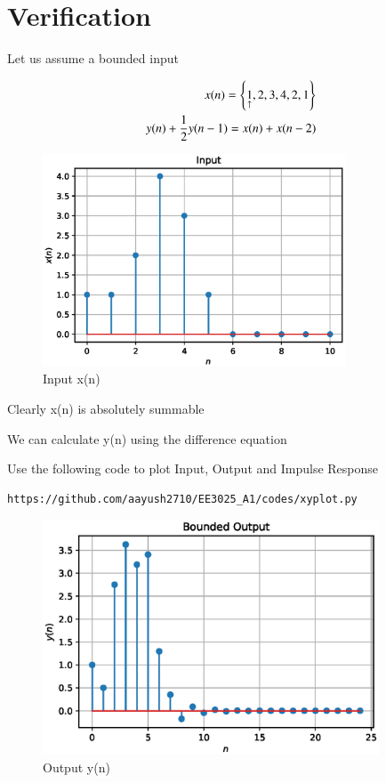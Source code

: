 \documentclass[journal,12pt,twocolumn]{IEEEtran}
\begin{document}
\section{Verification}

Let us assume a bounded input

\begin{align}
    x(n) = \left\{\underset{\uparrow}{1},2,3,4,2,1\right\}\\
    y(n)+\frac{1}{2}y(n-1) = x(n)+x(n-2)
\end{align}

\begin{figure}[h!]
    \centering
    \includegraphics[width=9cm]{./figs/fig_x.eps}
    \caption{Input x(n)}
    \label{x(n)}
\end{figure}

Clearly x(n) is absolutely summable

We can calculate y(n) using the difference equation

Use the following code to plot Input, Output and Impulse Response
\\
\begin{lstlisting}
https://github.com/aayush2710/EE3025_A1/codes/xyplot.py
\end{lstlisting}

\begin{figure}[h!]
    \centering
    \includegraphics[width=10cm]{./figs/fig_y.eps}
    \caption{Output y(n)}
    \label{y(n)}
\end{figure}
\end{document}

